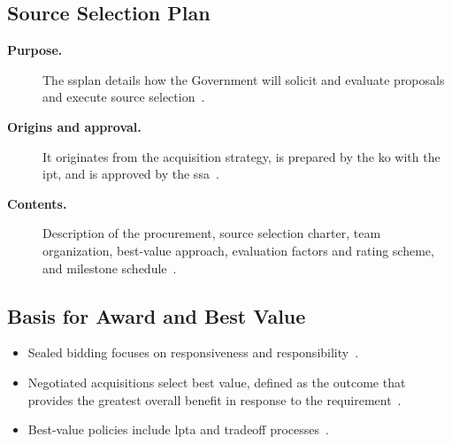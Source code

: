 \documentclass[../main.tex]{subfiles}
\begin{document}
\subsection{Source Selection Plan}
\begin{description}
  \item[\textbf{Purpose.}] The \ac{ssplan} details how the Government will solicit and evaluate proposals and execute source selection~\autocite{edo-3-2-3-source-selection-2025,DoD-Source-Selection-Procedures-2022}.
  \item[\textbf{Origins and approval.}] It originates from the acquisition strategy, is prepared by the \ac{ko} with the \ac{ipt}, and is approved by the \ac{ssa}~\autocite{edo-3-2-3-source-selection-2025,DoD-Source-Selection-Procedures-2022,FAR-15-303-Responsibilities}.
  \item[\textbf{Contents.}] Description of the procurement, source selection charter, team organization, best-value approach, evaluation factors and rating scheme, and milestone schedule~\autocite{edo-3-2-3-source-selection-2025,DoD-Source-Selection-Procedures-2022,FAR-15-304-Evaluation-Factors}.
\end{description}

\subsection{Basis for Award and Best Value}
\begin{itemize}
  \item Sealed bidding focuses on responsiveness and responsibility~\autocite{edo-3-2-3-source-selection-2025}.
  \item Negotiated acquisitions select best value, defined as the outcome that provides the greatest overall benefit in response to the requirement~\autocite{edo-3-2-3-source-selection-2025,FAR-15-101-Best-Value}.
  \item Best-value policies include \ac{lpta} and tradeoff processes~\autocite{edo-3-2-3-source-selection-2025,FAR-15-101-Best-Value,FAR-15-101-1-Tradeoff,FAR-15-101-2-LPTA}.
\end{itemize}
\end{document}
